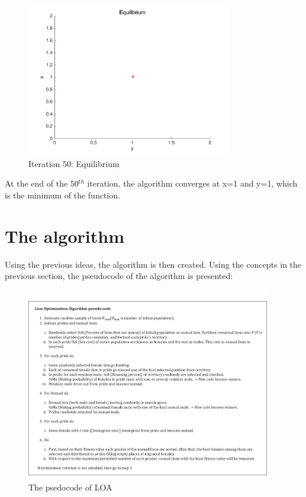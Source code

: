 \begin{figure}[H]
\begin{center}
\includegraphics[width=0.8\textwidth]{img/mdme/equilibrium50}
\caption{Iteration 50: Equilibrium}
\end{center}
\end{figure}

At the end of the 50$^{th}$ iteration, the algorithm converges at x=1 and y=1, which is the minimum of the function.

\section{The algorithm}

Using the previous ideas, the algorithm is then created. Using the concepts in the previous section, the pseudocode of the algorithm is presented:

\begin{figure}[H]
\begin{center}
\includegraphics[width=0.95\textwidth]{img/pseudocode}
\caption{The psedocode of LOA}
\end{center}
\end{figure}

